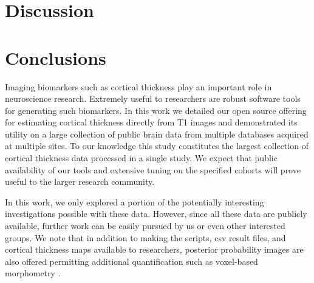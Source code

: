 \section{Discussion}

%
%
%
%
%
%
%



\section{Conclusions}

Imaging biomarkers such as cortical thickness play an 
important role in neuroscience research.  Extremely useful to
researchers are robust software tools for generating such 
biomarkers.  In this work we detailed our open source offering for estimating
cortical thickness directly from T1 images and demonstrated
its utility on a large collection of public brain data from
multiple databases acquired at multiple sites.  To our knowledge
this study constitutes the largest collection of cortical
thickness data processed in a single study.  
We expect that public availability of our tools and extensive tuning on 
the specified cohorts will prove useful to the larger
research community.  

In this work, we only explored a portion of the potentially
interesting investigations possible with these data.  However,
since all these data are publicly available, further work can
be easily pursued by us or even other interested groups.  We 
note that in addition to making the scripts, csv result files,
and cortical thickness maps available to researchers, 
posterior probability images are also offered permitting additional
quantification such as voxel-based morphometry \citep{ashburner2000}.
